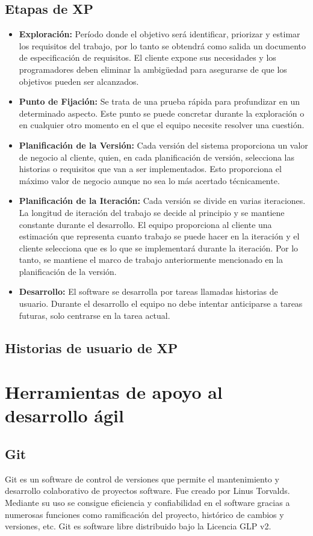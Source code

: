 \subsection{Etapas de XP}
\begin{itemize}
	\item  \textbf{Exploración:} Período donde el objetivo será identificar, priorizar y estimar los requisitos del trabajo, por lo tanto se obtendrá como salida un documento de especificación de requisitos. El cliente expone sus necesidades y los programadores deben eliminar la ambigüedad para asegurarse de que los objetivos pueden ser alcanzados.
	\item \textbf{Punto de Fijación:} Se trata de una prueba rápida para profundizar en un determinado aspecto. Este punto se puede concretar durante la exploración o en cualquier otro momento en el que el equipo necesite resolver una cuestión.
	\item \textbf{Planificación de la Versión:} Cada versión del sistema proporciona un valor de negocio al cliente, quien, en cada planificación de versión, selecciona las historias o requisitos que van a ser implementados. Esto proporciona el máximo valor de negocio aunque no sea lo más acertado técnicamente.
	\item \textbf{Planificación de la Iteración:} Cada versión se divide en varias iteraciones. La longitud de iteración del trabajo se decide al principio y se mantiene constante durante el desarrollo. El equipo proporciona al cliente una estimación que representa cuanto trabajo se puede hacer en la iteración y el cliente selecciona que es lo que se implementará durante la iteración. Por lo tanto, se mantiene el marco de trabajo anteriormente mencionado en la planificación de la versión.
	\item \textbf{Desarrollo:} El software se desarrolla por tareas llamadas historias de usuario. Durante el desarrollo el equipo no debe intentar anticiparse a tareas futuras, solo centrarse en la tarea actual.
\end{itemize}
\subsection{Historias de usuario de XP}
\section{Herramientas de apoyo al desarrollo ágil}
\subsection{Git}
Git es un software de control de versiones que permite el mantenimiento y desarrollo colaborativo de proyectos software. Fue creado por Linus Torvalds. Mediante su uso se consigue eficiencia y confiabilidad en el software gracias a numerosas funciones como ramificación del proyecto, histórico de cambios y versiones, etc. Git es software libre distribuido bajo la Licencia \gls{GLP} v2.
